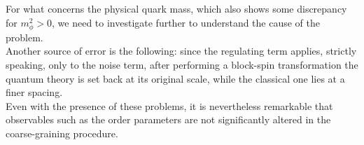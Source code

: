 For what concerns the physical quark mass, which also shows some discrepancy for $m_\phi^2 > 0$, we need to investigate further to understand the cause of the problem. \\
Another source of error is the following: since the regulating term applies, strictly speaking, only to the noise term, after performing a block-spin transformation the quantum theory is set back at its original scale, while the classical one lies at a finer spacing. \\
Even with the presence of these problems, it is nevertheless remarkable that observables such as the order parameters are not significantly altered in the coarse-graining procedure.